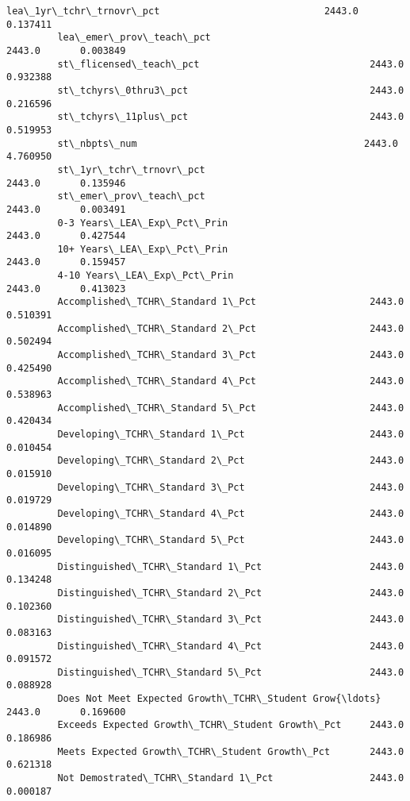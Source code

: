 \documentclass[11pt]{article}
\begin{document}
\begin{Verbatim}[commandchars=\\\{\}]
         lea\_1yr\_tchr\_trnovr\_pct                             2443.0       0.137411   
         lea\_emer\_prov\_teach\_pct                             2443.0       0.003849   
         st\_flicensed\_teach\_pct                              2443.0       0.932388   
         st\_tchyrs\_0thru3\_pct                                2443.0       0.216596   
         st\_tchyrs\_11plus\_pct                                2443.0       0.519953   
         st\_nbpts\_num                                        2443.0       4.760950   
         st\_1yr\_tchr\_trnovr\_pct                              2443.0       0.135946   
         st\_emer\_prov\_teach\_pct                              2443.0       0.003491   
         0-3 Years\_LEA\_Exp\_Pct\_Prin                          2443.0       0.427544   
         10+ Years\_LEA\_Exp\_Pct\_Prin                          2443.0       0.159457   
         4-10 Years\_LEA\_Exp\_Pct\_Prin                         2443.0       0.413023   
         Accomplished\_TCHR\_Standard 1\_Pct                    2443.0       0.510391   
         Accomplished\_TCHR\_Standard 2\_Pct                    2443.0       0.502494   
         Accomplished\_TCHR\_Standard 3\_Pct                    2443.0       0.425490   
         Accomplished\_TCHR\_Standard 4\_Pct                    2443.0       0.538963   
         Accomplished\_TCHR\_Standard 5\_Pct                    2443.0       0.420434   
         Developing\_TCHR\_Standard 1\_Pct                      2443.0       0.010454   
         Developing\_TCHR\_Standard 2\_Pct                      2443.0       0.015910   
         Developing\_TCHR\_Standard 3\_Pct                      2443.0       0.019729   
         Developing\_TCHR\_Standard 4\_Pct                      2443.0       0.014890   
         Developing\_TCHR\_Standard 5\_Pct                      2443.0       0.016095   
         Distinguished\_TCHR\_Standard 1\_Pct                   2443.0       0.134248   
         Distinguished\_TCHR\_Standard 2\_Pct                   2443.0       0.102360   
         Distinguished\_TCHR\_Standard 3\_Pct                   2443.0       0.083163   
         Distinguished\_TCHR\_Standard 4\_Pct                   2443.0       0.091572   
         Distinguished\_TCHR\_Standard 5\_Pct                   2443.0       0.088928   
         Does Not Meet Expected Growth\_TCHR\_Student Grow{\ldots}  2443.0       0.169600   
         Exceeds Expected Growth\_TCHR\_Student Growth\_Pct     2443.0       0.186986   
         Meets Expected Growth\_TCHR\_Student Growth\_Pct       2443.0       0.621318   
         Not Demostrated\_TCHR\_Standard 1\_Pct                 2443.0       0.000187   

\end{Verbatim}
\end{document}
